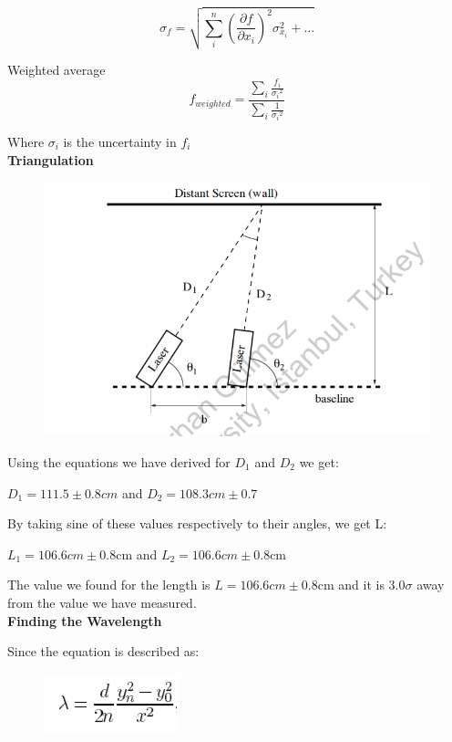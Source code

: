 \documentclass[10pt,a4paper]{article}
\begin{document}
{\begin{equation}
{\sigma }_{f}=\sqrt{\sum _{i}^{n}{\left(\frac{\partial f}{\partial {x}_{i}}\right)}^{2}{\sigma }_{{x}_{i}}^{2}+\dots }
\end{equation}
\par Weighted average
\begin{equation}
f_{weighted}=\frac{\sum _{i}\frac{{f}_{i}}{{\sigma_i }^{2}}}{\sum _{i}\frac{1}{{\sigma_i }^{2}}}
\end{equation}
\par Where $\sigma_i$ is the uncertainty in $f_i$
\\[\baselineskip]
\textbf{\small{Triangulation}}
\begin{figure}[H]
	\begin{center}
		\includegraphics[scale=0.8]{tri.png}
	\end{center}
\end{figure}
\par Using the equations we have derived for $D_1$ and $D_2$ we get:
\par $D_1=111.5\pm 0.8 cm$ and $D_2=108.3cm\pm0.7$
\par By taking sine of these values respectively to their angles, we get L:
\par $L_1=106.6cm \pm0.8$cm and $L_2=106.6cm\pm0.8$cm
\par The value we found for the length is $L=106.6cm \pm0.8$cm and it is 3.0$\sigma$ away from the value we have measured.
\\[\baselineskip]
\textbf{\small{Finding the Wavelength}}
\par Since the equation is described as:
\begin{figure}[H]
	\begin{center}
		\includegraphics[scale=0.8]{lambda.png}

\end{center}
\end{figure}}
\end{document}
